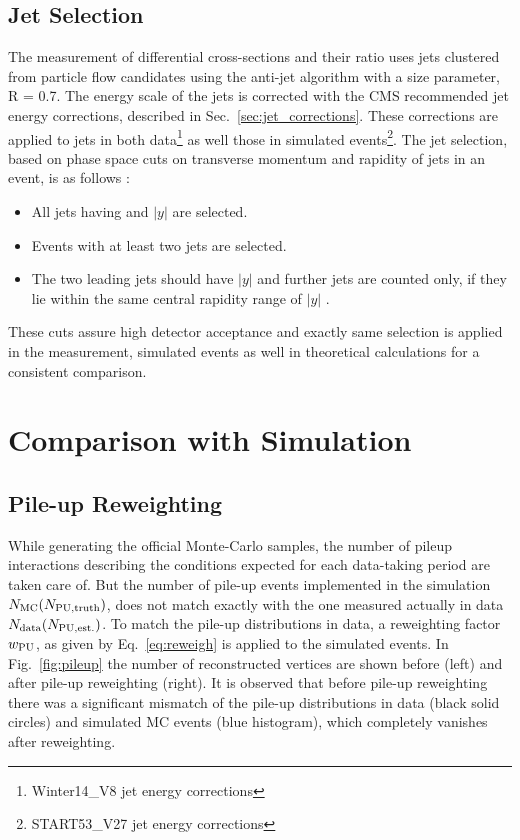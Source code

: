 \subsection{Jet Selection}
The measurement of differential cross-sections and their ratio uses jets clustered from particle flow candidates using the anti-\kt jet algorithm with a size parameter, R = 0.7. The energy scale of the jets is corrected with the CMS recommended jet energy corrections, described in Sec.~\ref{sec:jet_corrections}. These corrections are applied to jets in both data\footnote{Winter14\_V8 jet energy corrections} as well those in simulated events\footnote{START53\_V27 jet energy corrections}. The jet selection, based on phase space cuts on transverse momentum and rapidity of jets in an event, is as follows : 

\begin{itemize}
\item All jets having \pt {} \GeV and $|y|$  are selected.
\item Events with at least two jets are selected.
\item The two leading jets should have $|y|$  and further jets are counted only, if they lie within the same central rapidity range of $|y|$ . 
\end{itemize}
These cuts assure high detector acceptance and exactly same selection is applied in the measurement, simulated events as well in theoretical calculations for a consistent comparison. 

\section{Comparison with Simulation}
\subsection{Pile-up Reweighting}
While generating the official Monte-Carlo samples, the number of pileup interactions describing the conditions expected for each data-taking period are taken care of. But the number of pile-up events implemented in the simulation $N_{\rm MC} (N_{\rm PU,truth})$, does not match exactly with the one measured actually in data $N_{\rm data} (N_{\rm PU,est.})$. To match the pile-up distributions in data, a reweighting factor $w_{\rm PU}$, as given by Eq.~\ref{eq:reweigh} is applied to the simulated events. In Fig.~\ref{fig:pileup} the number of reconstructed vertices are shown before (left) and after pile-up reweighting (right). It is observed that before pile-up reweighting there was a significant mismatch of the pile-up distributions in data (black solid circles) and simulated MC events (blue histogram), which completely vanishes after reweighting. 

